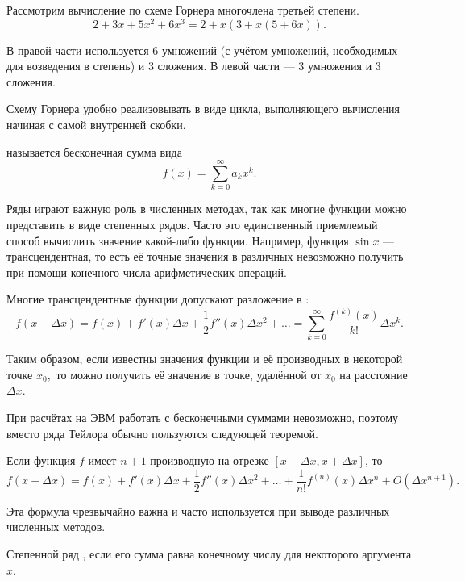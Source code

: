 \begin{example}
  Рассмотрим вычисление по схеме Горнера многочлена третьей степени.
  \[
  2 + 3x + 5 x^2 + 6 x^3 = 2 + x(3 + x(5 + 6 x)).
  \]

  В правой части используется 6 умножений (с учётом умножений,
  необходимых для возведения в степень) и 3 сложения. В левой части —
  3 умножения и 3 сложения.
\end{example}

Схему Горнера удобно реализовывать в виде цикла, выполняющего
вычисления начиная с самой внутренней скобки.


 называется бесконечная сумма
вида
\[
f(x) = \sum_{k=0}^{\infty} a_k x^k.
\]

Ряды играют важную роль в численных методах, так как многие функции
можно представить в виде степенных рядов. Часто это единственный
приемлемый способ вычислить значение какой-либо функции. Например,
функция $\sin x$ — трансцендентная, то есть её точные значения в
различных невозможно получить при помощи конечного числа
арифметических операций.

Многие трансцендентные функции допускают разложение в
:
\[
  f(x + \Delta x) =
  f(x) + f'(x) \Delta x + \frac12 f''(x) \Delta x^2 + \ldots=
  \sum_{k=0}^{\infty}\frac{f^{(k)}(x)}{k!}\Delta x^{k}.
\]

Таким образом, если известны значения функции и её производных в
некоторой точке $x_{0},$ то можно получить её значение в точке,
удалённой от $x_{0}$ на расстояние $\Delta x$.

При расчётах на ЭВМ работать с бесконечными суммами невозможно,
поэтому вместо ряда Тейлора обычно пользуются следующей теоремой.

\begin{thm}
  Если функция $f$ имеет $n+1$ производную на отрезке $[x - \Delta x,
    x + \Delta x]$, то
  \[
  \boxed{
  f(x + \Delta x) =
  f(x) + f'(x) \Delta x + \frac12 f''(x) \Delta x^2 + \ldots
  + \frac1{n!} f^{(n)}(x) \Delta x^n + O(\Delta x^{n+1}).
  }
  \]
\end{thm}

Эта формула чрезвычайно важна и часто используется при выводе
различных численных методов.


\begin{defn}
Степенной ряд , если его
сумма равна конечному числу для некоторого аргумента $x$.
\end{defn}

